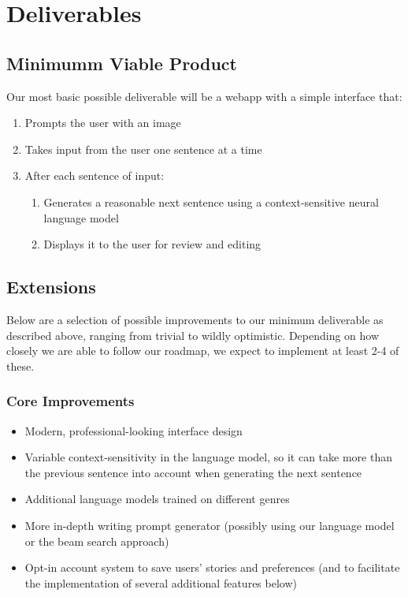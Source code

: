 \section{Deliverables}\label{sec:deliverables}
\subsection{Minimumm Viable Product}\label{subsec:mvp}
Our most basic possible deliverable will be a webapp with a simple interface that:
\begin{enumerate}
  \item Prompts the user with an image
  \item Takes input from the user one sentence at a time
  \item After each sentence of input:
  \begin{enumerate}
    \item Generates a reasonable next sentence using a context-sensitive neural
        language model
    \item Displays it to the user for review and editing
  \end{enumerate}
\end{enumerate}
\subsection{Extensions}\label{subsec:extensions}
Below are a selection of possible improvements to our minimum deliverable as
described above, ranging from trivial to wildly optimistic. Depending on how
closely we are able to follow our roadmap, we expect to implement at least 2-4 of these.
\subsubsection{Core Improvements}\label{subsubsec:core_imp}
\begin{itemize}
  \item Modern, professional-looking interface design
  \item Variable context-sensitivity in the language model, so it can take more than the previous sentence into account when generating the next sentence
  \item Additional language models trained on different genres
  \item More in-depth writing prompt generator (possibly using our language model or the beam search approach\cite{clark})
  \item Opt-in account system to save users’ stories and preferences (and to facilitate the implementation of several additional features below)
\end{itemize}
